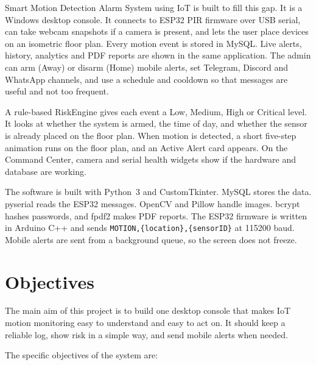 \documentclass[12pt,a4paper]{report}
\begin{document}
Smart Motion Detection Alarm System using IoT is built to fill this gap. It is a Windows desktop console. It connects to ESP32 PIR firmware over USB serial, can take webcam snapshots if a camera is present, and lets the user place devices on an isometric floor plan. Every motion event is stored in MySQL. Live alerts, history, analytics and PDF reports are shown in the same application. The admin can arm (Away) or disarm (Home) mobile alerts, set Telegram, Discord and WhatsApp channels, and use a schedule and cooldown so that messages are useful and not too frequent.

A rule-based RiskEngine gives each event a Low, Medium, High or Critical level. It looks at whether the system is armed, the time of day, and whether the sensor is already placed on the floor plan. When motion is detected, a short five-step animation runs on the floor plan, and an Active Alert card appears. On the Command Center, camera and serial health widgets show if the hardware and database are working.

The software is built with Python~3 and CustomTkinter. MySQL stores the data. pyserial reads the ESP32 messages. OpenCV and Pillow handle images. bcrypt hashes passwords, and fpdf2 makes PDF reports. The ESP32 firmware is written in Arduino C++ and sends \texttt{MOTION,\{location\},\{sensorID\}} at 115200 baud. Mobile alerts are sent from a background queue, so the screen does not freeze.

\section{Objectives}

The main aim of this project is to build one desktop console that makes IoT motion monitoring easy to understand and easy to act on. It should keep a reliable log, show risk in a simple way, and send mobile alerts when needed.

The specific objectives of the system are:
\end{document}
